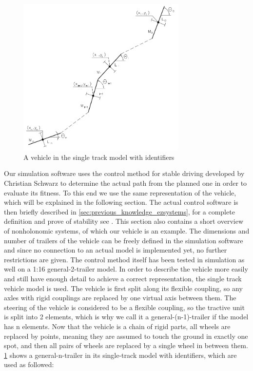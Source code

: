 \begin{figure}[t]
\centering
\includegraphics[width=0.75\textwidth]{./Chapters/Figures/single-track-model.png}
\caption{A vehicle in the single track model with identifiers \cite{12} \label{pic:single-track-model}}
\end{figure}

Our simulation software uses the control method for stable driving developed by Christian Schwarz to determine the actual path from the planned one in order to evaluate its fitness. To this end we use the same representation of the vehicle, which will be explained in the following section. The actual control software is then briefly described in \ref{sec:previous_knowledge_ezsystems}, for a complete definition and prove of stability see \cite{12}. This section also contains a short overview of nonholonomic systems, of which our vehicle is an example.
The dimensions and number of trailers of the vehicle can be freely defined in the simulation software and since no connection to an actual model is implemented yet, no further restrictions are given. The control method itself has been tested in simulation as well on a 1:16 general-2-trailer model. In order to describe the vehicle more easily and still have enough detail to achieve a correct representation, the single track vehicle model is used\cite{27}. The vehicle is first split along its flexible coupling, so any axles with rigid couplings are replaced by one virtual axis between them. The steering of the vehicle is considered to be a flexible coupling, so the tractive unit is split into 2 elements, which is why we call it a general-(n-1)-trailer if the model has n elements. Now that the vehicle is a chain of rigid parts, all wheels are replaced by points, meaning they are assumed to touch the ground in exactly one spot, and then all pairs of wheels are replaced by a single wheel in between them. \ref{pic:single-track-model} shows a general-n-trailer in its single-track model with identifiers, which are used as followed:

